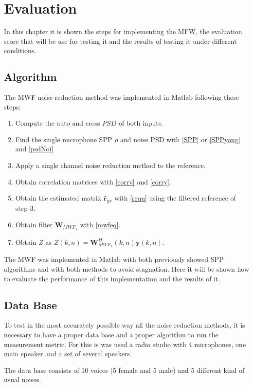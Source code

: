 \chapter{Evaluation}
 In this chapter it is shown the steps for implementing the MFW, the evaluation score that will be use for testing it and the results of testing it under different conditions.
 
 \section{Algorithm}
 
The MWF noise reduction method was implemented in Matlab following these steps:

\begin{enumerate}
\item Compute the auto and cross $PSD$ of both inputs.
\item Find the single microphone SPP $\rho$ and noise PSD with \eqref{SPP} or \eqref{SPPyong} and \eqref{psdNoi}
\item Apply a single channel noise reduction method to the reference. 
\item Obtain correlation matrices with \eqref{corrv} and \eqref{corry}.
\item Obtain the estimated matrix $\hat{\textbf{r}}_{yx}$ with \eqref{requ} using the filtered reference of step 3.
\item Obtain filter  $\textbf{W}_{MWF_\lambda}$  with \eqref{mwfeq}.
\item Obtain $Z$ as $Z(k,n)=\textbf{W}_{MWF_\lambda}^H(k,n)\textbf{y}(k,n)$.
\end{enumerate}

The MWF was implemented in Matlab with both previously showed SPP algorithms and with both methods to avoid stagnation. Here it will be shown how to evaluate the performance of this implementation and the results of it.

\section{Data Base}

To test in the most accurately possible way all the noise reduction methods, it is necessary to have a proper data base and a proper algorithm to run the measurement metric. For this is was used a radio studio with 4 microphones, one main speaker and a set of several speakers.

The data base consists of 10 voices (5 female and 5 male) and 5 different kind of usual noises.

